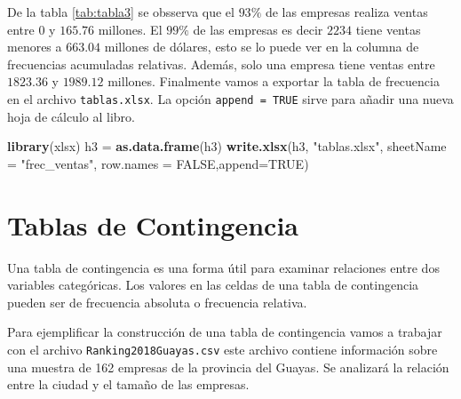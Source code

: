 \documentclass[]{book}
\newenvironment{Shaded}{\begin{snugshade}}{\end{snugshade}}
\newcommand{\DataTypeTok}[1]{\textcolor[rgb]{0.13,0.29,0.53}{#1}}
\newcommand{\DecValTok}[1]{\textcolor[rgb]{0.00,0.00,0.81}{#1}}
\newcommand{\KeywordTok}[1]{\textcolor[rgb]{0.13,0.29,0.53}{\textbf{#1}}}
\newcommand{\NormalTok}[1]{#1}
\newcommand{\OperatorTok}[1]{\textcolor[rgb]{0.81,0.36,0.00}{\textbf{#1}}}
\newcommand{\OtherTok}[1]{\textcolor[rgb]{0.56,0.35,0.01}{#1}}
\newcommand{\StringTok}[1]{\textcolor[rgb]{0.31,0.60,0.02}{#1}}
\begin{document}
De la tabla \ref{tab:tabla3} se obsserva que el \(93\%\) de las empresas realiza ventas entre 0 y \(165.76\) millones. El \(99\%\) de las empresas es decir \(2234\) tiene ventas menores a \(663.04\) millones de dólares, esto se lo puede ver en la columna de frecuencias acumuladas relativas. Además, solo una empresa tiene ventas entre \(1823.36\) y \(1989.12\) millones. Finalmente vamos a exportar la tabla de frecuencia en el archivo \texttt{tablas.xlsx}. La opción \texttt{append\ =\ TRUE} sirve para añadir una nueva hoja de cálculo al libro.

\begin{Shaded}
\begin{Highlighting}[]
\KeywordTok{library}\NormalTok{(xlsx)}
\NormalTok{h3 =}\StringTok{ }\KeywordTok{as.data.frame}\NormalTok{(h3)}
\KeywordTok{write.xlsx}\NormalTok{(h3, }\StringTok{"tablas.xlsx"}\NormalTok{, }\DataTypeTok{sheetName =} \StringTok{"frec_ventas"}\NormalTok{, }\DataTypeTok{row.names =} \OtherTok{FALSE}\NormalTok{,}\DataTypeTok{append=}\OtherTok{TRUE}\NormalTok{)}
\end{Highlighting}
\end{Shaded}

\hypertarget{tablas-de-contingencia}{%
\section{Tablas de Contingencia}\label{tablas-de-contingencia}}

Una tabla de contingencia es una forma útil para examinar relaciones entre dos variables categóricas. Los valores en las celdas de una tabla de contingencia pueden ser de frecuencia absoluta o frecuencia relativa.

Para ejemplificar la construcción de una tabla de contingencia vamos a trabajar con el archivo \texttt{Ranking2018Guayas.csv} este archivo contiene información sobre una muestra de 162 empresas de la provincia del Guayas. Se analizará la relación entre la ciudad y el tamaño de las empresas.

\begin{Shaded}
\end{Shaded}
\end{document}
